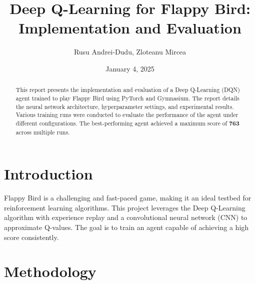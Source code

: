 \documentclass[a4paper,12pt]{article}
\title{Deep Q-Learning for Flappy Bird: Implementation and Evaluation}
\author{Rusu Andrei-Dudu, Zloteanu Mircea}
\date{January 4, 2025}
\begin{document}
\maketitle

\begin{abstract}
This report presents the implementation and evaluation of a Deep Q-Learning (DQN) agent trained to play Flappy Bird using PyTorch and Gymnasium. The report details the neural network architecture, hyperparameter settings, and experimental results. Various training runs were conducted to evaluate the performance of the agent under different configurations. The best-performing agent achieved a maximum score of \textbf{763} across multiple runs.
\end{abstract}

\section{Introduction}
Flappy Bird is a challenging and fast-paced game, making it an ideal testbed for reinforcement learning algorithms. This project leverages the Deep Q-Learning algorithm with experience replay and a convolutional neural network (CNN) to approximate Q-values. The goal is to train an agent capable of achieving a high score consistently.

\section{Methodology}
\end{document}
